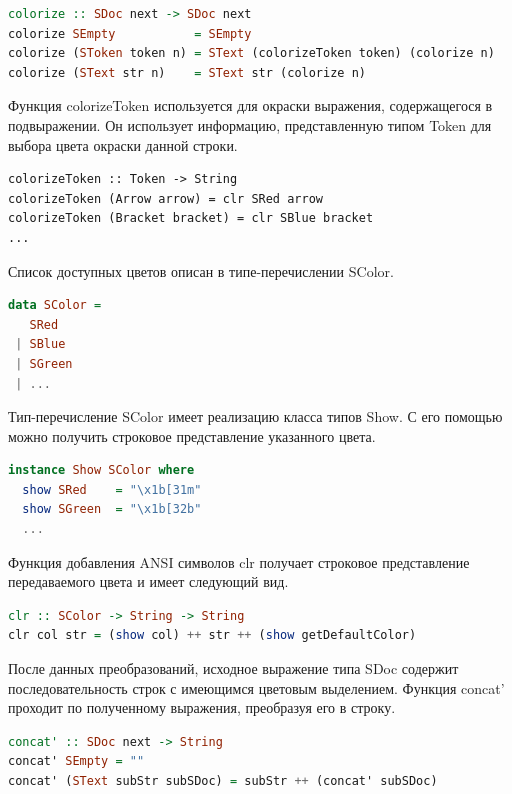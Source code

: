 \begin{lstlisting}[language=Haskell, caption=Окрашивание выражения]
colorize :: SDoc next -> SDoc next
colorize SEmpty           = SEmpty
colorize (SToken token n) = SText (colorizeToken token) (colorize n)
colorize (SText str n)    = SText str (colorize n)
\end{lstlisting}

Функция colorizeToken используется для окраски выражения, содержащегося в подвыражении. Он использует информацию, представленную типом Token для выбора цвета окраски данной строки.

\begin{lstlisting}
colorizeToken :: Token -> String
colorizeToken (Arrow arrow) = clr SRed arrow
colorizeToken (Bracket bracket) = clr SBlue bracket
...
\end{lstlisting}

Список доступных цветов описан в типе-перечислении SColor.

\begin{lstlisting}[language=Haskell]
data SColor = 
   SRed
 | SBlue
 | SGreen
 | ...
\end{lstlisting}

Тип-перечисление SColor имеет реализацию класса типов Show. С его помощью можно получить строковое представление указанного цвета.

\begin{lstlisting}[language=Haskell]
instance Show SColor where
  show SRed    = "\x1b[31m"
  show SGreen  = "\x1b[32b"
  ...
\end{lstlisting}

Функция добавления ANSI символов clr получает строковое представление передаваемого цвета и имеет следующий вид.

\begin{lstlisting}[language=Haskell]
clr :: SColor -> String -> String
clr col str = (show col) ++ str ++ (show getDefaultColor)
\end{lstlisting}

После данных преобразований, исходное выражение типа SDoc содержит последовательность строк с имеющимся цветовым выделением. Функция concat' проходит по полученному выражения, преобразуя его в строку.

\begin{lstlisting}[language=Haskell]
concat' :: SDoc next -> String
concat' SEmpty = ""
concat' (SText subStr subSDoc) = subStr ++ (concat' subSDoc)
\end{lstlisting}

